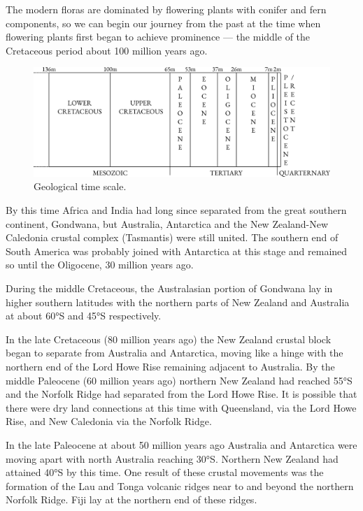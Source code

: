 The modern floras are dominated by flowering plants with conifer and fern components, so we can begin our journey from the past at the time when flowering plants first began to achieve prominence --- the middle of the Cretaceous period about 100 million years ago.
\begin{figure}[t]
	\centering
	\includegraphics[width=\textwidth]{graphics/figure123timescale.png}
	\caption[Geological time scale]{Geological time scale.}%
	\label{fig:123timescale}
\end{figure}
By this time Africa and India had long since separated from the great southern continent, Gondwana, but Australia, Antarctica and the New Zealand-New Caledonia crustal complex (Tasmantis) were still united.
The southern end of South America was probably joined with Antarctica at this stage and remained so until the Oligocene, 30 million years ago.

During the middle Cretaceous, the Australasian portion of Gondwana lay in higher southern latitudes with the northern parts of New Zealand and Australia at about \ang{60}S and \ang{45}S respectively.

In the late Cretaceous (80 million years ago) the New Zealand crustal block began to separate from Australia and Antarctica, moving like a hinge with the northern end of the Lord Howe Rise remaining adjacent to Australia.
By the middle Paleocene (60 million years ago) northern New Zealand had reached \ang{55}S and the Norfolk Ridge had separated from the Lord Howe Rise.
It is possible that there were dry land connections at this time with Queensland, via the Lord Howe Rise, and New Caledonia via the Norfolk Ridge.

In the late Paleocene at about 50 million years ago Australia and Antarctica were moving apart with north Australia reaching \ang{30}S.
Northern New Zealand had attained \ang{40}S by this time.
One result of these crustal movements was the formation of the Lau and Tonga volcanic ridges near to and beyond the northern Norfolk Ridge.
Fiji lay at the northern end of these ridges.

